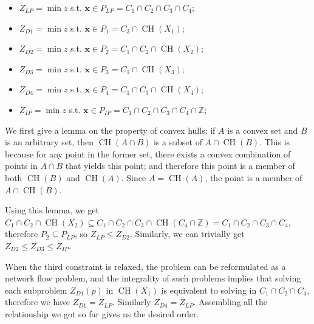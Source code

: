 \documentclass{article}
\newcommand{\x}{\bm x}
\begin{document}
\begin{itemize}
    \item $Z_{LP}=\min z$ s.t. $\x\in P_{LP}=C_1\cap C_2\cap C_3\cap C_4$;
    \item $Z_{D1}=\min z$ s.t. $\x\in P_1=C_3\cap \operatorname{CH}(X_1)$;
    \item $Z_{D2}=\min z$ s.t. $\x\in P_2=C_1\cap C_2\cap \operatorname{CH}(X_2)$;
    \item $Z_{D3}=\min z$ s.t. $\x\in P_3=C_1\cap \operatorname{CH}(X_3)$;
    \item $Z_{D4}=\min z$ s.t. $\x\in P_4=C_1\cap C_3\cap \operatorname{CH}(X_4)$;
    \item $Z_{IP}=\min z$ s.t. $\x\in P_{IP}=C_1\cap C_2\cap C_3\cap C_4\cap\mathbb Z$;
\end{itemize}

We first give a lemma on the property of convex hulls: if $A$ is a convex set and $B$ is an arbitrary set, then $\operatorname{CH}(A\cap B)$ is a subset of $A\cap\operatorname{CH}(B)$. This is because for any point in the former set, there exists a convex combination of points in $A\cap B$ that yields this point; and therefore this point is a member of both $\operatorname{CH}(B)$ and $\operatorname{CH}(A)$. Since $A=\operatorname{CH}(A)$, the point is a member of $A\cap\operatorname{CH}(B)$.


Using this lemma, we get $C_1\cap C_2\cap \operatorname{CH}(X_2)\subseteq C_1\cap C_2\cap C_3\cap \operatorname{CH}(C_4\cap\mathbb Z)=C_1\cap C_2\cap C_3\cap C_4$, therefore $P_2\subseteq P_{LP}$, so $Z_{LP}\le Z_{D2}$. Similarly, we can trivially get $Z_{D2}\le Z_{D3}\le Z_{IP}$.

When the third constraint is relaxed, the problem can be reformulated as a network flow problem, and the integrality of such problems implies that solving each subproblem $Z_{D1}(p)$ in $\operatorname{CH}(X_1)$ is equivalent to solving in $C_1\cap C_2\cap C_4$, therefore we have $Z_{D1}=Z_{LP}$. Similarly $Z_{D4}=Z_{LP}$. Assembling all the relationship we got so far gives us the desired order.

\section{}
\end{document}
